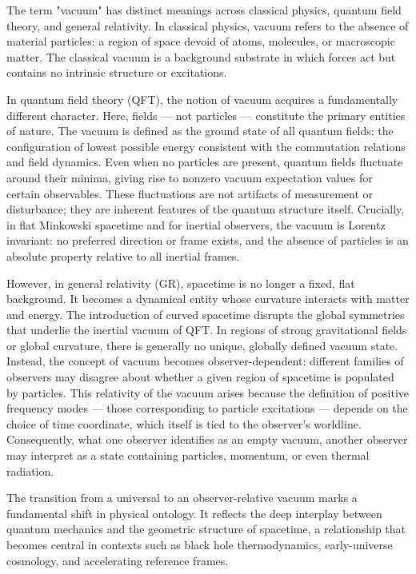 The term "vacuum" has distinct meanings across classical physics, quantum field theory, and general relativity. In classical physics, vacuum refers to the absence of material particles: a region of space devoid of atoms, molecules, or macroscopic matter. The classical vacuum is a background substrate in which forces act but contains no intrinsic structure or excitations.

In quantum field theory (QFT), the notion of vacuum acquires a fundamentally different character. Here, fields — not particles — constitute the primary entities of nature. The vacuum is defined as the ground state of all quantum fields: the configuration of lowest possible energy consistent with the commutation relations and field dynamics. Even when no particles are present, quantum fields fluctuate around their minima, giving rise to nonzero vacuum expectation values for certain observables. These fluctuations are not artifacts of measurement or disturbance; they are inherent features of the quantum structure itself. Crucially, in flat Minkowski spacetime and for inertial observers, the vacuum is Lorentz invariant: no preferred direction or frame exists, and the absence of particles is an absolute property relative to all inertial frames.

However, in general relativity (GR), spacetime is no longer a fixed, flat background. It becomes a dynamical entity whose curvature interacts with matter and energy. The introduction of curved spacetime disrupts the global symmetries that underlie the inertial vacuum of QFT. In regions of strong gravitational fields or global curvature, there is generally no unique, globally defined vacuum state. Instead, the concept of vacuum becomes observer-dependent: different families of observers may disagree about whether a given region of spacetime is populated by particles. This relativity of the vacuum arises because the definition of positive frequency modes — those corresponding to particle excitations — depends on the choice of time coordinate, which itself is tied to the observer's worldline. Consequently, what one observer identifies as an empty vacuum, another observer may interpret as a state containing particles, momentum, or even thermal radiation.

The transition from a universal to an observer-relative vacuum marks a fundamental shift in physical ontology. It reflects the deep interplay between quantum mechanics and the geometric structure of spacetime, a relationship that becomes central in contexts such as black hole thermodynamics, early-universe cosmology, and accelerating reference frames.

